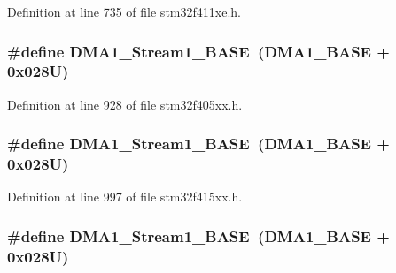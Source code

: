 Definition at line 735 of file stm32f411xe.\+h.

\subsubsection[{\texorpdfstring{D\+M\+A1\+\_\+\+Stream1\+\_\+\+B\+A\+SE}{DMA1_Stream1_BASE}}]{\setlength{\rightskip}{0pt plus 5cm}\#define D\+M\+A1\+\_\+\+Stream1\+\_\+\+B\+A\+SE~({\bf D\+M\+A1\+\_\+\+B\+A\+SE} + 0x028\+U)}\hypertarget{group___peripheral__registers__structures_ga5b4152cef577e37eccc9311d8bdbf3c2}{}\label{group___peripheral__registers__structures_ga5b4152cef577e37eccc9311d8bdbf3c2}


Definition at line 928 of file stm32f405xx.\+h.

\subsubsection[{\texorpdfstring{D\+M\+A1\+\_\+\+Stream1\+\_\+\+B\+A\+SE}{DMA1_Stream1_BASE}}]{\setlength{\rightskip}{0pt plus 5cm}\#define D\+M\+A1\+\_\+\+Stream1\+\_\+\+B\+A\+SE~({\bf D\+M\+A1\+\_\+\+B\+A\+SE} + 0x028\+U)}\hypertarget{group___peripheral__registers__structures_ga5b4152cef577e37eccc9311d8bdbf3c2}{}\label{group___peripheral__registers__structures_ga5b4152cef577e37eccc9311d8bdbf3c2}


Definition at line 997 of file stm32f415xx.\+h.

\subsubsection[{\texorpdfstring{D\+M\+A1\+\_\+\+Stream1\+\_\+\+B\+A\+SE}{DMA1_Stream1_BASE}}]{\setlength{\rightskip}{0pt plus 5cm}\#define D\+M\+A1\+\_\+\+Stream1\+\_\+\+B\+A\+SE~({\bf D\+M\+A1\+\_\+\+B\+A\+SE} + 0x028\+U)}\hypertarget{group___peripheral__registers__structures_ga5b4152cef577e37eccc9311d8bdbf3c2}{}\label{group___peripheral__registers__structures_ga5b4152cef577e37eccc9311d8bdbf3c2}


